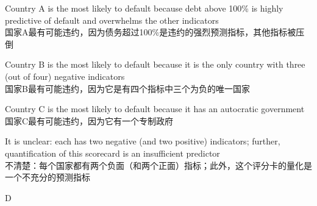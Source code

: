 \documentclass{article}
\begin{document}
\begin{choices}
    \item Country A is the most likely to default because debt above 100\% is highly predictive of default and overwhelms the other indicators
    \\国家A最有可能违约，因为债务超过100\%是违约的强烈预测指标，其他指标被压倒
    \item Country B is the most likely to default because it is the only country with three (out of four) negative indicators
    \\国家B最有可能违约，因为它是有四个指标中三个为负的唯一国家
    \item Country C is the most likely to default because it has an autocratic government
    \\国家C最有可能违约，因为它有一个专制政府
    \item It is unclear: each has two negative (and two positive) indicators; further, quantification of this scorecard is an insufficient predictor
    \\不清楚：每个国家都有两个负面（和两个正面）指标；此外，这个评分卡的量化是一个不充分的预测指标
\end{choices}

\begin{correctanswer}
    D
\end{correctanswer}
\end{document}
